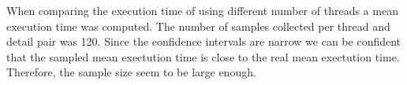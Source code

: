 When comparing the execution time of using different number of threads a mean execution time was computed. The number of samples collected per thread and detail pair was 120. Since the confidence intervals are narrow we can be confident that the sampled mean exectution time is close to the real mean exectution time. Therefore, the sample size seem to be large enough. 
  
